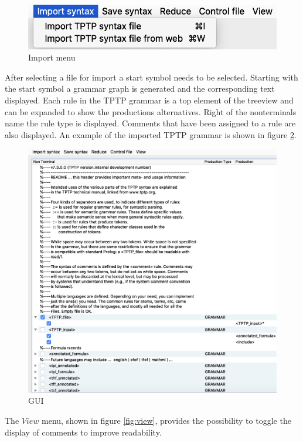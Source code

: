 \begin{figure}[H]
\centering
\includegraphics[width=.7\textwidth]{images/import.png}
\caption{Import menu}
\label{fig:import}
\end{figure}

After selecting a file for import a start symbol needs to be selected.
Starting with the start symbol a grammar graph is generated and the corresponding text displayed.
Each rule in the TPTP grammar is a top element of the treeview and can be expanded to show the productions alternatives.
Right of the nonterminals name the rule type is displayed.
Comments that have been assigned to a rule are also displayed. An example of the imported TPTP grammar is shown in figure \ref{fig:gui}.

\begin{figure}[H]
\centering
\includegraphics[width=1\textwidth]{images/gui.png}
\caption{GUI}
\label{fig:gui}
\end{figure}

The $View$ menu, shown in figure \ref{fig:view}, provides the possibility to toggle the display of comments to improve readability.

